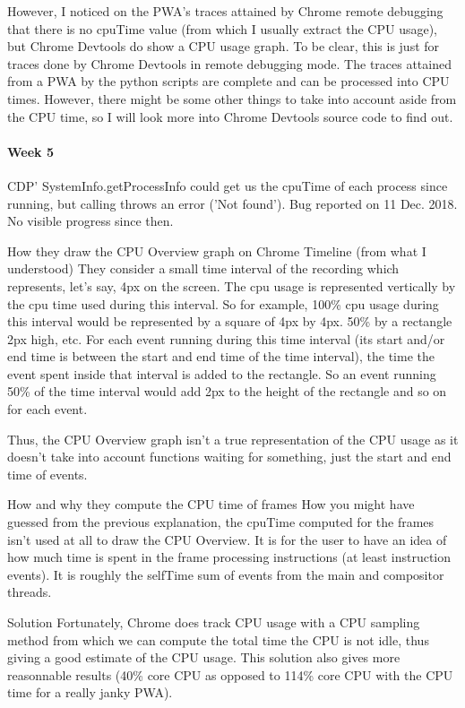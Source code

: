 \documentclass{kththesis}
\begin{document}
However, I noticed on the PWA's traces attained by Chrome remote debugging that there is no cpuTime value (from which I usually extract the CPU usage), but Chrome Devtools do show a CPU usage graph. To be clear, this is just for traces done by Chrome Devtools in remote debugging mode. The traces attained from a PWA by the python scripts are complete and can be processed into CPU times. However, there might be some other things to take into account aside from the CPU time, so I will look more into Chrome Devtools source code to find out.

\paragraph{Week 5}
CDP' SystemInfo.getProcessInfo could get us the cpuTime of each process since running, but calling throws an error ('Not found'). Bug reported on 11 Dec. 2018. No visible progress since then. 

How they draw the CPU Overview graph on Chrome Timeline (from what I understood)
   They consider a small time interval of the recording which represents, let's say, 4px on the screen. The cpu usage is represented vertically by the cpu time used during this interval. So for example, 100\% cpu usage during this interval would be represented by a square of 4px by 4px. 50\% by a rectangle 2px high, etc.  For each event running during this time interval (its start and/or end time is between the start and end time of the time interval), the time the event spent inside that interval is added to the rectangle. So an event running 50\% of the time interval would add 2px to the height of the rectangle and so on for each event. 

Thus, the CPU Overview graph isn't a true representation of the CPU usage as it doesn't take into account functions waiting for something, just the start and end time of events. 

How and why they compute the CPU time of frames
    How you might have guessed from the previous explanation, the cpuTime computed for the frames isn't used at all to draw the CPU Overview. It is for the user to have an idea of how much time is spent in the frame processing instructions (at least instruction events). It is roughly the selfTime sum of events from the main and compositor threads. 

Solution
    Fortunately, Chrome does track CPU usage with a CPU sampling method from which we can compute the total time the CPU is not idle, thus giving a good estimate of the CPU usage.
This solution also gives more reasonnable results (40\% core CPU as opposed to 114\% core CPU with the CPU time for a really janky PWA).
\end{document}

